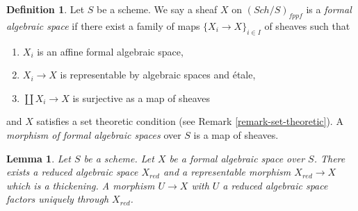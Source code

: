 \documentclass{stacks-project}
\theoremstyle{plain}
\newtheorem{lemma}[subsection]{Lemma}
\theoremstyle{definition}
\newtheorem{definition}[subsection]{Definition}
\theoremstyle{remark}
\numberwithin{equation}{subsection}
\def\Sch{\mathit{Sch}}
\begin{document}
\begin{definition}
\label{definition-formal-algebraic-space}
Let $S$ be a scheme. We say a sheaf $X$ on $(\Sch/S)_{fppf}$ is a
{\it formal algebraic space} if there exist a family of maps
$\{X_i \to X\}_{i \in I}$ of sheaves such that
\begin{enumerate}
\item $X_i$ is an affine formal algebraic space,
\item $X_i \to X$ is representable by algebraic spaces and \'etale,
\item $\coprod X_i \to X$ is surjective as a map of sheaves
\end{enumerate}
and $X$ satisfies a set theoretic condition
(see Remark \ref{remark-set-theoretic}). A
{\it morphism of formal algebraic spaces}
over $S$ is a map of sheaves.
\end{definition}

\begin{lemma}
\label{lemma-reduction-formal-algebraic-space}
Let $S$ be a scheme. Let $X$ be a formal algebraic space over $S$.
There exists a reduced algebraic space $X_{red}$ and a representable
morphism $X_{red} \to X$ which is a thickening. A morphism $U \to X$
with $U$ a reduced algebraic space factors uniquely through $X_{red}$.
\end{lemma}
\end{document}
